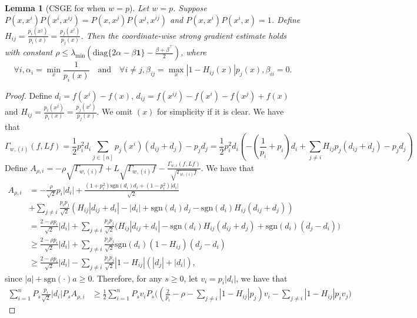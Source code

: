 \documentclass[11pt]{article}
\theoremstyle{plain}
\newtheorem{lemma}[theorem]{Lemma}
\theoremstyle{definition}
\theoremstyle{remark}
\newcommand{\diag}{\mathrm{diag}}
\newcommand{\sgn}{\mathrm{sgn}}
\newcommand{\tuple}[1]{\left(#1\right)}
\newcommand{\tp}{\tuple}
\newcommand{\abs}[1]{\left\vert#1\right\vert}
\def\*#1{\boldsymbol{#1}} %
\begin{document}
\begin{lemma}[CSGE for when $w = p$]\label{lem:CSGE_w=p}
    Let $w=p$.
    Suppose $P(x,x^i)P(x^i,x^{ij})=P(x,x^j)P(x^j,x^{ij})$ and $P(x,x^i)P(x^i,x)=1$.
    Define $H_{ij} = \frac{p_i(x^j)}{p_i(x)} = \frac{p_j(x^i)}{p_j(x)}$.
    Then the coordinate-wise strong gradient estimate holds with constant $\rho \leq \lambda_{\min}(\diag\{2\alpha-\beta\*1\} - \frac{\beta+\beta^{\top}}{2})$, where
    $$
        \forall i,\alpha_i = \min_x \frac{1}{p_i(x)}\quad \text{and}\quad\forall i\neq j, \beta_{ij} = \max_x|1-H_{ij}(x)|p_j(x), \beta_{ii}=0.
    $$
\end{lemma}
\begin{proof}
    Define $d_i = f(x^i) - f(x)$, $d_{ij} = f(x^{ij})-f(x^i)-f(x^j)+f(x)$ and $H_{ij} = \frac{p_i(x^j)}{p_i(x)} = \frac{p_j(x^i)}{p_j(x)}$.%
    We omit $(x)$ for simplicity if it is clear.
    We have that 
    $$
        \Gamma_{w,(i)}(f,Lf) = \frac 12p_i^2d_i\sum_{j\in [n]}p_j(x^i)(d_{ij}+d_j)-p_jd_j
        = \frac 12 p_i^2d_i\tp{-(\frac{1}{p_i}+p_i)d_i+\sum_{j\neq i}H_{ij}p_j(d_{ij}+d_j)-p_jd_j}
    $$
    Define $A_{\rho,i} = -\rho \sqrt{\Gamma_{w,(i)}f_{}} + L\sqrt{\Gamma_{w,(i)}f_{}} - \frac{\Gamma_{w,i}(f_{},Lf_{})}{\sqrt{\Gamma_{w,(i)}f}}$.
    We have that
    \begin{align}
        A_{\rho,i}& = -\frac{\rho}{\sqrt{2}}p_i\abs{d_i} + \frac{(1+p_i^2)\sgn(d_i)d_i+(1-p_i^2)|d_i|}{\sqrt{2}} \nonumber
        \\&+\sum_{j\neq i}\frac{p_ip_j}{\sqrt 2}(H_{ij}\abs{d_{ij}+d_i}-\abs{d_i} + \sgn(d_i)d_j-\sgn(d_i)H_{ij}(d_{ij}+d_j)) \nonumber
        \\&=\frac{2-\rho p_i}{\sqrt 2}|d_i|+\sum_{j\neq i}\frac{p_ip_j}{\sqrt 2}\bigg(H_{ij}\abs{d_{ij}+d_i}-\sgn(d_i)H_{ij}(d_{ij}+d_j)+\sgn(d_i)(d_j-d_i)\bigg) \nonumber
        \\&\geq \frac{2-\rho p_i}{\sqrt 2}|d_i|+\sum_{j\neq i}\frac{p_ip_j}{\sqrt 2}\sgn(d_i)(1-H_{ij})(d_j-d_i) \nonumber
        \\&\geq \frac{2-\rho p_i}{\sqrt 2}|d_i|-\sum_{j\neq i}\frac{p_ip_j}{\sqrt 2}|1-H_{ij}|(|d_j|+|d_i|) ,\label{eq:A_rhoi_lower_bound}
    \end{align}
    since $|a|+\sgn(\cdot)a\geq 0$.
    Therefore, for any $s\geq 0$, let $v_i = p_i|d_i|$, we have that 
    \begin{align*}
        \sum_{i=1}^n P_s \frac{p_i}{\sqrt 2}|d_i|P_s A_{\rho,i}
        &\geq \frac 12\sum_{i=1}^n P_sv_iP_s\bigg((\frac{2}{p_i}-\rho - \sum_{j\neq i}\abs{1-H_{ij}}p_j)v_i - \sum_{j\neq i}\abs{1-H_{ij}}p_iv_j\bigg)

\end{align*}
\end{proof}
\end{document}
